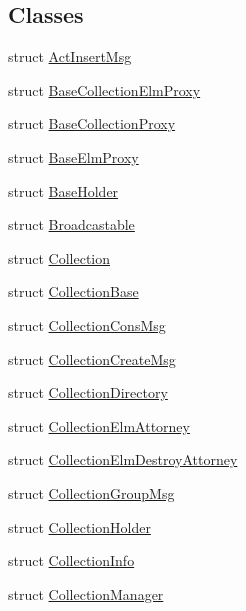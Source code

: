 \subsection*{Classes}
\begin{DoxyCompactItemize}
\item 
struct \hyperlink{structvt_1_1vrt_1_1collection_1_1_act_insert_msg}{Act\+Insert\+Msg}
\item 
struct \hyperlink{structvt_1_1vrt_1_1collection_1_1_base_collection_elm_proxy}{Base\+Collection\+Elm\+Proxy}
\item 
struct \hyperlink{structvt_1_1vrt_1_1collection_1_1_base_collection_proxy}{Base\+Collection\+Proxy}
\item 
struct \hyperlink{structvt_1_1vrt_1_1collection_1_1_base_elm_proxy}{Base\+Elm\+Proxy}
\item 
struct \hyperlink{structvt_1_1vrt_1_1collection_1_1_base_holder}{Base\+Holder}
\item 
struct \hyperlink{structvt_1_1vrt_1_1collection_1_1_broadcastable}{Broadcastable}
\item 
struct \hyperlink{structvt_1_1vrt_1_1collection_1_1_collection}{Collection}
\item 
struct \hyperlink{structvt_1_1vrt_1_1collection_1_1_collection_base}{Collection\+Base}
\item 
struct \hyperlink{structvt_1_1vrt_1_1collection_1_1_collection_cons_msg}{Collection\+Cons\+Msg}
\item 
struct \hyperlink{structvt_1_1vrt_1_1collection_1_1_collection_create_msg}{Collection\+Create\+Msg}
\item 
struct \hyperlink{structvt_1_1vrt_1_1collection_1_1_collection_directory}{Collection\+Directory}
\item 
struct \hyperlink{structvt_1_1vrt_1_1collection_1_1_collection_elm_attorney}{Collection\+Elm\+Attorney}
\item 
struct \hyperlink{structvt_1_1vrt_1_1collection_1_1_collection_elm_destroy_attorney}{Collection\+Elm\+Destroy\+Attorney}
\item 
struct \hyperlink{structvt_1_1vrt_1_1collection_1_1_collection_group_msg}{Collection\+Group\+Msg}
\item 
struct \hyperlink{structvt_1_1vrt_1_1collection_1_1_collection_holder}{Collection\+Holder}
\item 
struct \hyperlink{structvt_1_1vrt_1_1collection_1_1_collection_info}{Collection\+Info}
\item 
struct \hyperlink{structvt_1_1vrt_1_1collection_1_1_collection_manager}{Collection\+Manager}

\end{DoxyCompactItemize}
